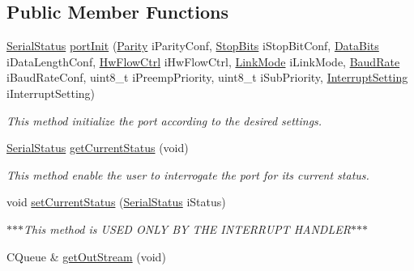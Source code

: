 \subsection*{\-Public \-Member \-Functions}
\begin{DoxyCompactItemize}
\item 
\hyperlink{_serial_type_8h_a71c113451bfafdaf5fcabcd807acd480}{\-Serial\-Status} \hyperlink{class_async_serial_port1_a25a461dcd724608e7b014d5d14127b0b}{port\-Init} (\hyperlink{_serial_type_8h_ac47b2bd906d2c843b97ecae6c1eea710}{\-Parity} i\-Parity\-Conf, \hyperlink{_serial_type_8h_a2e4c31ec0a94db405865b7c241717fbe}{\-Stop\-Bits} i\-Stop\-Bit\-Conf, \hyperlink{_serial_type_8h_a11275f46707b20c44d7b07eb6ca04baf}{\-Data\-Bits} i\-Data\-Length\-Conf, \hyperlink{_serial_type_8h_a0ed0ee4a49d7dcf4109ba39a3ca1a8b7}{\-Hw\-Flow\-Ctrl} i\-Hw\-Flow\-Ctrl, \hyperlink{_serial_type_8h_a30da35a35e2d0882c738f6f991905df7}{\-Link\-Mode} i\-Link\-Mode, \hyperlink{_serial_type_8h_a7654bd82719bfde1c792d7828664dde2}{\-Baud\-Rate} i\-Baud\-Rate\-Conf, uint8\-\_\-t i\-Preemp\-Priority, uint8\-\_\-t i\-Sub\-Priority, \hyperlink{_serial_type_8h_ad8005790f3b92862aa09c52f14f58e24}{\-Interrupt\-Setting} i\-Interrupt\-Setting)
\begin{DoxyCompactList}\small\item\em \-This method initialize the port according to the desired settings. \end{DoxyCompactList}\item 
\hyperlink{_serial_type_8h_a71c113451bfafdaf5fcabcd807acd480}{\-Serial\-Status} \hyperlink{class_async_serial_port1_ae5c7825b0eb62d17f937e1db43bd72ab}{get\-Current\-Status} (void)
\begin{DoxyCompactList}\small\item\em \-This method enable the user to interrogate the port for its current status. \end{DoxyCompactList}\item 
\hypertarget{class_async_serial_port1_ad62d4d10e37dc483addf7df23f3cd4dc}{void \hyperlink{class_async_serial_port1_ad62d4d10e37dc483addf7df23f3cd4dc}{set\-Current\-Status} (\hyperlink{_serial_type_8h_a71c113451bfafdaf5fcabcd807acd480}{\-Serial\-Status} i\-Status)}\label{class_async_serial_port1_ad62d4d10e37dc483addf7df23f3cd4dc}

\begin{DoxyCompactList}\small\item\em $\ast$$\ast$$\ast$\-This method is \-U\-S\-E\-D \-O\-N\-L\-Y \-B\-Y \-T\-H\-E \-I\-N\-T\-E\-R\-R\-U\-P\-T \-H\-A\-N\-D\-L\-E\-R$\ast$$\ast$$\ast$ \end{DoxyCompactList}\item 
\hypertarget{class_async_serial_port1_a826613a7951299d92cda2a7dac338636}{\-C\-Queue \& \hyperlink{class_async_serial_port1_a826613a7951299d92cda2a7dac338636}{get\-Out\-Stream} (void)}\label{class_async_serial_port1_a826613a7951299d92cda2a7dac338636}


\end{DoxyCompactItemize}
